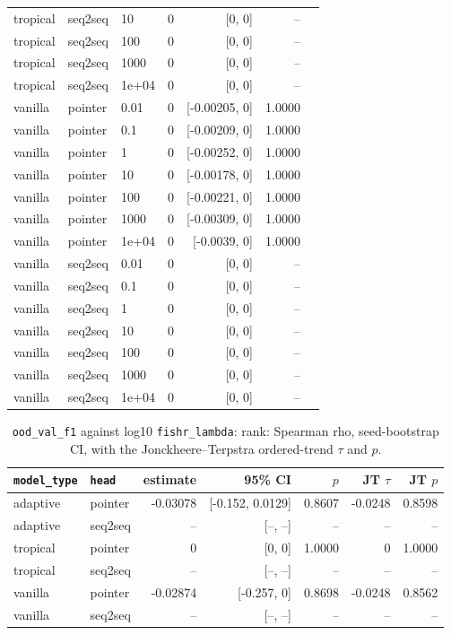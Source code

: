 \documentclass[10pt]{article}
\begin{document}
{\begin{longtable}{lllrrrl}
tropical & seq2seq & 10 & 0 & [0, 0] & -- & \\
tropical & seq2seq & 100 & 0 & [0, 0] & -- & \\
tropical & seq2seq & 1000 & 0 & [0, 0] & -- & \\
tropical & seq2seq & 1e+04 & 0 & [0, 0] & -- & \\
vanilla & pointer & 0.01 & 0 & [-0.00205, 0] & 1.0000 & \\
vanilla & pointer & 0.1 & 0 & [-0.00209, 0] & 1.0000 & \\
vanilla & pointer & 1 & 0 & [-0.00252, 0] & 1.0000 & \\
vanilla & pointer & 10 & 0 & [-0.00178, 0] & 1.0000 & \\
vanilla & pointer & 100 & 0 & [-0.00221, 0] & 1.0000 & \\
vanilla & pointer & 1000 & 0 & [-0.00309, 0] & 1.0000 & \\
vanilla & pointer & 1e+04 & 0 & [-0.0039, 0] & 1.0000 & \\
vanilla & seq2seq & 0.01 & 0 & [0, 0] & -- & \\
vanilla & seq2seq & 0.1 & 0 & [0, 0] & -- & \\
vanilla & seq2seq & 1 & 0 & [0, 0] & -- & \\
vanilla & seq2seq & 10 & 0 & [0, 0] & -- & \\
vanilla & seq2seq & 100 & 0 & [0, 0] & -- & \\
vanilla & seq2seq & 1000 & 0 & [0, 0] & -- & \\
vanilla & seq2seq & 1e+04 & 0 & [0, 0] & -- & \\
\bottomrule
\end{longtable}
}

{\small
\begin{longtable}{llrrrrr}
\caption{\texttt{ood\_val\_f1} against log10 \texttt{fishr\_lambda}: rank: Spearman rho, seed-bootstrap CI, with the Jonckheere--Terpstra ordered-trend $\tau$ and $p$.}\label{tab:trend-ood_val_f1}\\
\toprule
\texttt{model\_type} & \texttt{head} & estimate & 95\% CI & $p$ & JT $\tau$ & JT $p$\\
\midrule
\endhead
adaptive & pointer & -0.03078 & [-0.152, 0.0129] & 0.8607 & -0.0248 & 0.8598\\
adaptive & seq2seq & -- & [--, --] & -- & -- & --\\
tropical & pointer & 0 & [0, 0] & 1.0000 & 0 & 1.0000\\
tropical & seq2seq & -- & [--, --] & -- & -- & --\\
vanilla & pointer & -0.02874 & [-0.257, 0] & 0.8698 & -0.0248 & 0.8562\\
vanilla & seq2seq & -- & [--, --] & -- & -- & --\\
\bottomrule
\end{longtable}
}
\end{document}
